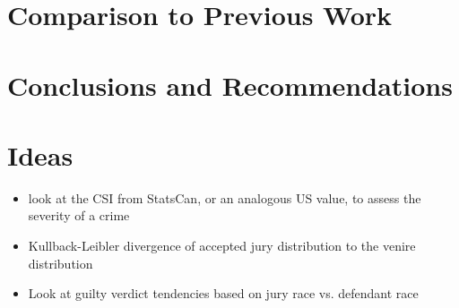 \documentclass{article}
\begin{document}
\section{Comparison to Previous Work} \label{sec:comparison}

\section{Conclusions and Recommendations} \label{sec:conclusion}

\section{Ideas}
\begin{itemize}
\item look at the CSI from StatsCan, or an analogous US value, to assess the severity of a crime
\item Kullback-Leibler divergence of accepted jury distribution to the venire distribution
\item Look at guilty verdict tendencies based on jury race vs. defendant race
\end{itemize}


 
\end{document}
